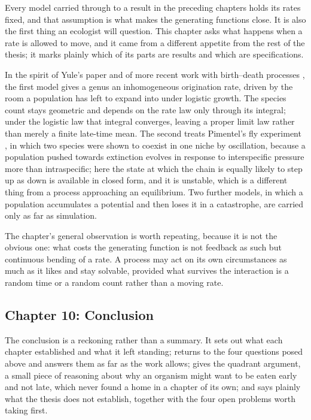 Every model carried through to a result in the preceding chapters holds its
rates fixed, and that assumption is what makes the generating functions close.
It is also the first thing an ecologist will question. This chapter asks what
happens when a rate is allowed to move, and it came from a different appetite
from the rest of the thesis; it marks plainly which of its parts are results
and which are specifications.

In the spirit of Yule's paper and of more recent work with birth--death
processes \cite{nee1994extinction}, the first model gives a genus an
inhomogeneous origination rate, driven by the room a population has left to
expand into under logistic growth. The species count stays geometric and
depends on the rate law only through its integral; under the logistic law that
integral converges, leaving a proper limit law rather than merely a finite
late-time mean. The second treats Pimentel's fly experiment
\cite{pimentel1965selection,hutchingson2018ecological}, in which two species
were shown to coexist in one niche by oscillation, because a population pushed
towards extinction evolves in response to interspecific pressure more than
intraspecific; here the state at which the chain is equally likely to step up
as down is available in closed form, and it is unstable, which is a different
thing from a process approaching an equilibrium. Two further models, in which a
population accumulates a potential and then loses it in a catastrophe, are
carried only as far as simulation.

The chapter's general observation is worth repeating, because it is not the
obvious one: what costs the generating function is not feedback as such but
continuous bending of a rate. A process may act on its own circumstances as
much as it likes and stay solvable, provided what survives the interaction is a
random time or a random count rather than a moving rate.

\subsection*{Chapter 10: Conclusion}

The conclusion is a reckoning rather than a summary. It sets out what each
chapter established and what it left standing; returns to the four questions posed
above and answers them as far as the work allows;
gives the quadrant argument, a small piece of reasoning about why an organism
might want to be eaten early and not late, which never found a home in a
chapter of its own; and says plainly what the thesis does not establish,
together with the four open problems worth taking first.
